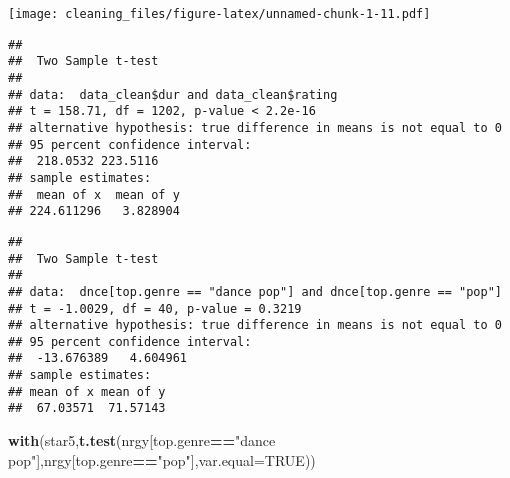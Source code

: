 \documentclass[
]{article}
\newenvironment{Shaded}{\begin{snugshade}}{\end{snugshade}}
\newcommand{\CommentTok}[1]{\textcolor[rgb]{0.56,0.35,0.01}{\textit{#1}}}
\newcommand{\DataTypeTok}[1]{\textcolor[rgb]{0.13,0.29,0.53}{#1}}
\newcommand{\DecValTok}[1]{\textcolor[rgb]{0.00,0.00,0.81}{#1}}
\newcommand{\KeywordTok}[1]{\textcolor[rgb]{0.13,0.29,0.53}{\textbf{#1}}}
\newcommand{\NormalTok}[1]{#1}
\newcommand{\OperatorTok}[1]{\textcolor[rgb]{0.81,0.36,0.00}{\textbf{#1}}}
\newcommand{\OtherTok}[1]{\textcolor[rgb]{0.56,0.35,0.01}{#1}}
\newcommand{\StringTok}[1]{\textcolor[rgb]{0.31,0.60,0.02}{#1}}
\begin{document}
\texttt{[image: cleaning\_files/figure-latex/unnamed-chunk-1-11.pdf]}

\begin{Shaded}
\end{Shaded}

\begin{verbatim}
## 
##  Two Sample t-test
## 
## data:  data_clean$dur and data_clean$rating
## t = 158.71, df = 1202, p-value < 2.2e-16
## alternative hypothesis: true difference in means is not equal to 0
## 95 percent confidence interval:
##  218.0532 223.5116
## sample estimates:
##  mean of x  mean of y 
## 224.611296   3.828904
\end{verbatim}

\begin{Shaded}
\end{Shaded}

\begin{verbatim}
## 
##  Two Sample t-test
## 
## data:  dnce[top.genre == "dance pop"] and dnce[top.genre == "pop"]
## t = -1.0029, df = 40, p-value = 0.3219
## alternative hypothesis: true difference in means is not equal to 0
## 95 percent confidence interval:
##  -13.676389   4.604961
## sample estimates:
## mean of x mean of y 
##  67.03571  71.57143
\end{verbatim}

\begin{Shaded}
\begin{Highlighting}[]
\KeywordTok{with}\NormalTok{(star5,}\KeywordTok{t.test}\NormalTok{(nrgy[top.genre}\OperatorTok{==}\StringTok{"dance pop"}\NormalTok{],nrgy[top.genre}\OperatorTok{==}\StringTok{"pop"}\NormalTok{],}\DataTypeTok{var.equal=}\OtherTok{TRUE}\NormalTok{))}
\end{Highlighting}
\end{Shaded}
\end{document}

